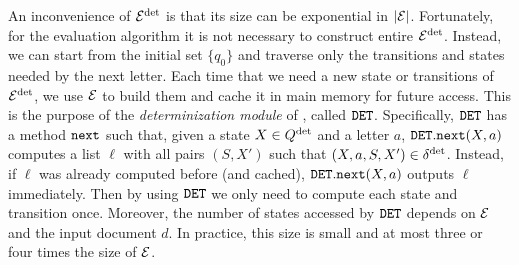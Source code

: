 An inconvenience of $\mathcal{E}^{{\operatorname{det}}}$ is that its size can be exponential in
$|\mathcal{E}|$. Fortunately, for the evaluation algorithm it is not necessary to
construct %
entire $\mathcal{E}^{{\operatorname{det}}}$. Instead, we can start from the initial set $\{q_0\}$ and
traverse only the transitions and states needed by the next letter. Each time
that we need a new state or transitions of $\mathcal{E}^{{\operatorname{det}}}$, we use $\mathcal{E}$ to build
them and cache it in main memory for future access. This is the purpose of the
\emph{determinization module} of \rematch, called $\mathtt{DET}$. Specifically, $\mathtt{DET}$
has a method $\texttt{next}$ such that, given a state $X \in Q^{\operatorname{det}}$ and a letter
$a$, $\mathtt{DET}.\texttt{next}(X, a)$ computes a list $\ell$ with all pairs $(S, X')$
such that $(X,a,S,X') \in \delta^{\operatorname{det}}$. Instead, if $\ell$ was already computed
before (and cached), $\mathtt{DET}.\texttt{next}(X, a)$ outputs $\ell$ immediately. Then by
using $\mathtt{DET}$ we only need to compute each state and transition once. Moreover,
the number of states accessed by $\mathtt{DET}$ depends on $\mathcal{E}$ and the input document
$d$. In practice, this size is small and at most three or four times the size of
$\mathcal{E}$.

